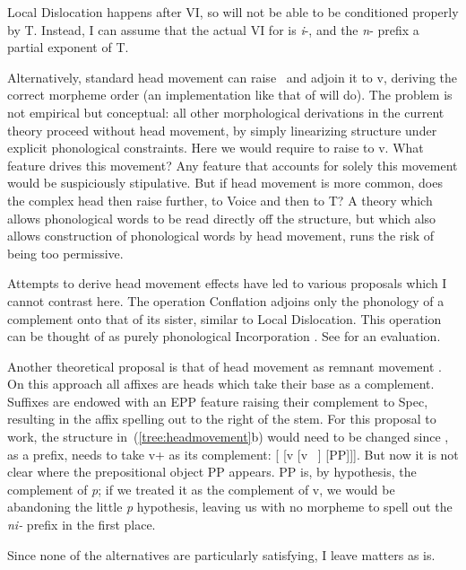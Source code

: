 Local Dislocation happens after VI, so {\pz} will not be able to be conditioned properly by T. Instead, I can assume that the actual VI for {\pz} is \emph{i}-, and the \emph{n}- prefix a partial exponent of T.

Alternatively, standard head movement can raise \pz~and adjoin it to v, deriving the correct morpheme order (an implementation like that of \citealt{matushansky06} will do). The problem is not empirical but conceptual: all other morphological derivations in the current theory proceed without head movement, by simply linearizing structure under explicit phonological constraints. Here we would require {\pz} to raise to v. What feature drives this movement? Any feature that accounts for solely this movement would be suspiciously stipulative. But if head movement is more common, does the complex head then raise further, to Voice and then to T? A theory which allows phonological words to be read directly off the structure, but which also allows construction of phonological words by head movement, runs the risk of being too permissive.

Attempts to derive head movement effects have led to various proposals which I cannot contrast here. The operation Conflation \citep{halekeyser02,harley13oup} adjoins only the phonology of a complement onto that of its sister, similar to Local Dislocation. This operation can be thought of as purely phonological Incorporation \citep{baker85,baker88}. See \citet[Ch.~2.5]{rimell12} for an evaluation.

Another theoretical proposal is that of head movement as remnant movement \citep{koopmanszabolcsi00,koopman05,koopman15u20}. On this approach all affixes are heads which take their base as a complement. Suffixes are endowed with an EPP feature raising their complement to Spec, resulting in the affix spelling out to the right of the stem. For this proposal to work, the structure in~(\ref{tree:headmovement}b) would need to be changed since \pz, as a prefix, needs to take v+ as its complement: [{\pz} [v [v ~\!] [PP]]]. But now it is not clear where the prepositional object PP appears. PP is, by hypothesis, the complement of \emph{p}; if we treated it as the complement of v, we would be abandoning the little \emph{p} hypothesis, leaving us with no morpheme to spell out the \emph{ni-} prefix in the first place.

Since none of the alternatives are particularly satisfying, I leave matters as is.


